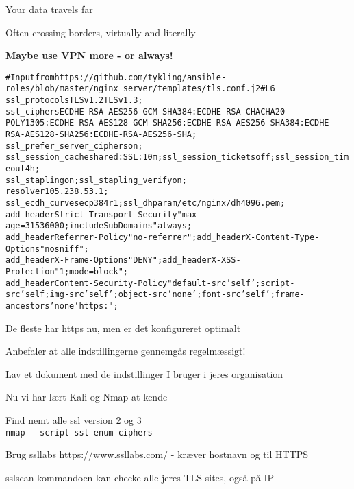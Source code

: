 \documentclass[Screen16to9,17pt]{foils}
\begin{document}
\begin{list2}
\item Your data travels far
\item Often crossing borders, virtually and literally
\end{list2}

\vskip 5mm
\centerline{\bf\Large Maybe use VPN more - or always!}



\begin{alltt}\footnotesize
  # Input from https://github.com/tykling/ansible-roles/blob/master/nginx_server/templates/tls.conf.j2#L6
  ssl_protocols                   TLSv1.2 TLSv1.3;
  ssl_ciphers                     ECDHE-RSA-AES256-GCM-SHA384:ECDHE-RSA-CHACHA20-POLY1305:ECDHE-RSA-AES128-GCM-SHA256:ECDHE-RSA-AES256-SHA384:ECDHE-RSA-AES128-SHA256:ECDHE-RSA-AES256-SHA;
  ssl_prefer_server_ciphers       on;
  ssl_session_cache               shared:SSL:10m;     ssl_session_tickets       off;   ssl_session_timeout    4h;
  ssl_stapling                    on;                 ssl_stapling_verify       on;
  resolver                        105.238.53.1;
  ssl_ecdh_curve secp384r1;                           ssl_dhparam /etc/nginx/dh4096.pem;
  add_header Strict-Transport-Security "max-age=31536000; includeSubDomains" always;
  add_header Referrer-Policy "no-referrer";  add_header X-Content-Type-Options "nosniff";
  add_header X-Frame-Options "DENY";  add_header X-XSS-Protection "1; mode=block";
  add_header Content-Security-Policy "default-src 'self'; script-src 'self; img-src 'self'; object-src 'none'; font-src 'self'; frame-ancestors 'none' https:";
\end{alltt}

\begin{list2}
\item De fleste har https nu, men er det konfigureret optimalt
\item Anbefaler at alle indstillingerne gennemgås regelmæssigt!
\item Lav et dokument med de indstillinger I bruger i jeres organisation
\end{list2}



\begin{list1}
\item Nu vi har lært Kali og Nmap at kende
\begin{list2}
\item Find nemt alle ssl version 2 og 3\\
\verb+nmap --script ssl-enum-ciphers+
\item Brug ssllabs https://www.ssllabs.com/ - kræver hostnavn og til HTTPS
\item sslscan kommandoen kan checke alle jeres TLS sites, også på IP
\end{list2}
\end{list1}
\end{document}
